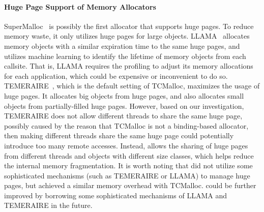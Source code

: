 \paragraph{Huge Page Support of Memory Allocators}
SuperMalloc~\cite{supermalloc} is possibly the first allocator that supports huge pages. To reduce memory waste, it only utilizes huge pages for large objects. LLAMA~\cite{LLAMA} allocates memory objects with a similar expiration time to the same huge pages, and utilizes machine learning to identify the lifetime of memory objects from each callsite. That is, LLAMA requires the profiling to adjust its memory allocations for each application, which could be expensive or inconvenient to do so. TEMERAIRE~\cite{TEMERAIRE}, which is the default setting of TCMalloc, maximizes the usage of huge pages. It allocates big objects from huge pages, and also allocates small objects from partially-filled huge pages. However, based on our investigation, TEMERAIRE does not allow different threads to share the same huge page, 
possibly caused by the reason that TCMalloc is not a binding-based allocator, then making different threads share the same huge page could potentially introduce too many remote accesses.  
Instead, \NM{} allows the sharing of huge pages from different threads and objects with different size classes, which helps reduce the internal memory fragmentation. It is worth noting that \NM{} did not utilize some sophisticated mechanisms (such as TEMERAIRE or LLAMA) to manage huge pages, but achieved a similar memory overhead with TCMalloc. 
\NM{} could be further improved by borrowing some sophisticated mechanisms of LLAMA and TEMERAIRE in the future. 



